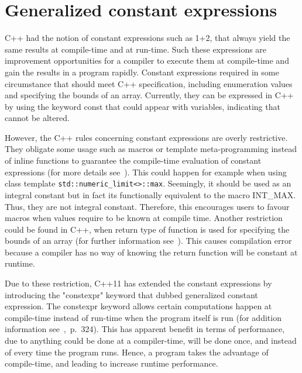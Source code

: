 \documentclass[11pt]{report}
\begin{document}
\section{Generalized constant expressions}
\label{section: Generalized constant expressions}
C++ had the notion of constant expressions such as 1+2, that always yield the same results at compile-time and at run-time. Such these expressions are improvement opportunities for a compiler to execute them at compile-time and gain the results in a program rapidly. Constant expressions required in some circumstance that should meet C++ specification, including enumeration values and specifying the bounds of an array. Currently, they can be expressed in C++ by using the keyword const that could appear with variables, indicating that cannot be altered.

However, the C++ rules concerning constant expressions are overly restrictive. They obligate some usage such as macros or template meta-programming instead of inline functions to guarantee the compile-time evaluation of constant expressions (for more details see~\cite{Stroustrup:2012:Cpp11}). This could happen for example when using class template \texttt{std::numeric\_limit<>::max}. Seemingly, it should be used as an integral constant but in fact its functionally equivalent to the macro INT\_MAX. Thus, they are not integral constant. Therefore, this encourages users to favour macros when values require to be known at compile time. Another restriction could be found in C++, when return type of function is used for specifying the bounds of an array (for further information see~\cite{Stroustrup:2012:Cpp11}). This causes compilation error because a compiler has no way of knowing the return function will be constant at runtime.

Due to these restriction, C++11 has extended the constant expressions by introducing the "constexpr" keyword that dubbed generalized constant expression. The constexpr keyword allows certain computations happen at compile-time instead of run-time when the program itself is run (for addition information see~\cite{Williams:2012:CCA},~p.~324). This has apparent benefit in terms of performance, due to anything could be done at a compiler-time, will be done once, and instead of every time the program runs. Hence, a program takes the advantage of compile-time, and leading to increase runtime performance.
\end{document}
